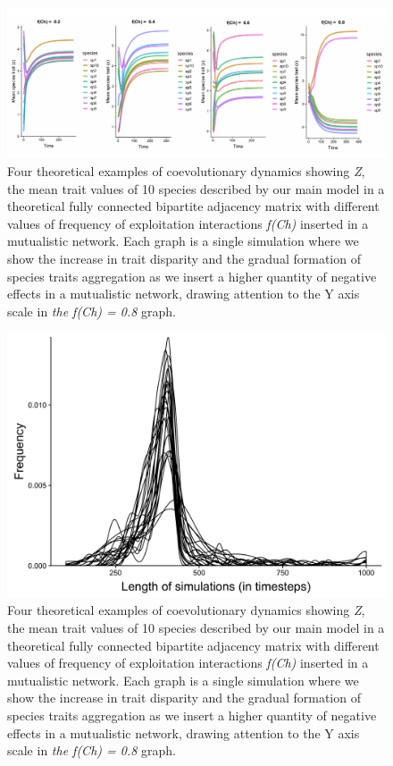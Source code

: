 \documentclass[a4paper, 12pt]{article}
\begin{document}
\begin{singlespace}
\begin{figure}[H]
 \centering
  \includegraphics[width=\linewidth]{Sup_Figura_3.pdf}
  \vspace*{-7mm}
  \caption{Four theoretical examples of coevolutionary dynamics showing \textit{Z}, the mean trait values of 10 species described by our main model in a theoretical fully connected bipartite adjacency matrix with different values of frequency of exploitation interactions \textit{f(Ch)} inserted in a mutualistic network. Each graph is a single simulation where we show the increase in trait disparity and the gradual formation of species traits aggregation as we insert a higher quantity of negative effects in a mutualistic network, drawing attention to the Y axis scale in \textit{the f(Ch) = 0.8} graph.}
  \label{supfig:3}
\end{figure}

\begin{figure}[H]
 \centering
  \includegraphics[width=\linewidth]{Sup_Figura_4.png}
  \vspace*{-7mm}
  \caption{Four theoretical examples of coevolutionary dynamics showing \textit{Z}, the mean trait values of 10 species described by our main model in a theoretical fully connected bipartite adjacency matrix with different values of frequency of exploitation interactions \textit{f(Ch)} inserted in a mutualistic network. Each graph is a single simulation where we show the increase in trait disparity and the gradual formation of species traits aggregation as we insert a higher quantity of negative effects in a mutualistic network, drawing attention to the Y axis scale in \textit{the f(Ch) = 0.8} graph.}
  \label{supfig:4}
\end{figure}


\end{singlespace}
\end{document}
